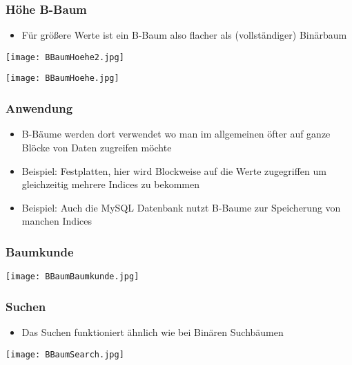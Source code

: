 		\subsubsection{Höhe B-Baum}
			\begin{minipage}{0.5\textwidth}
				\begin{itemize}
					\item Für grö\ss ere Werte ist ein B-Baum also flacher als (vollständiger) Binärbaum
				\end{itemize}

				\begin{center}
					\texttt{[image: BBaumHoehe2.jpg]}
				\end{center}
			\end{minipage}
			\begin{minipage}{0.45\textwidth}
				\begin{center}
					\texttt{[image: BBaumHoehe.jpg]}
				\end{center}
			\end{minipage}
			
		
		\subsubsection{Anwendung}
			\begin{itemize}
				\item B-Bäume werden dort verwendet wo man im allgemeinen öfter auf ganze Blöcke 
					von Daten zugreifen möchte
				\item Beispiel: Festplatten, hier wird Blockweise auf die Werte zugegriffen um gleichzeitig
					mehrere Indices zu bekommen
				\item Beispiel: Auch die MySQL Datenbank nutzt B-Baume zur Speicherung von manchen Indices
			\end{itemize}


		\subsubsection{Baumkunde}
			\begin{center}
				\texttt{[image: BBaumBaumkunde.jpg]}
			\end{center}


		\subsubsection{Suchen}
			\begin{minipage}{0.5\textwidth}
				\begin{itemize}
					\item Das Suchen funktioniert ähnlich wie bei Binären Suchbäumen
				\end{itemize}
			\end{minipage}
			\begin{minipage}{0.45\textwidth}
				\begin{center}
					\texttt{[image: BBaumSearch.jpg]}
				\end{center}
			\end{minipage}


